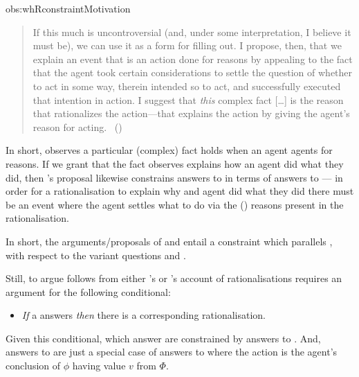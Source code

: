 \begin{note}
\begin{motivation}{obs:whRconstraintMotivation}
\begin{quote}
      If this much is uncontroversial (and, under some interpretation, I believe it must be), we can use it as a form for filling out.
      I propose, then, that we explain an event that is an action done for reasons by appealing to the fact that the agent took certain considerations to settle the question of whether to act in some way, therein intended so to act, and successfully executed that intention in action.
      I suggest that \emph{this} complex fact [\dots] is the reason that rationalizes the action---that explains the action by giving the agent's reason for acting.%
      \mbox{ }\hfill\mbox{(\citeyear[421]{Hieronymi:2011aa})}
    \end{quote}
    In short, \citeauthor{Hieronymi:2011aa} observes a particular (complex) fact holds when an agent agents for reasons.
    If we grant that the fact \citeauthor{Hieronymi:2011aa} observes explains how an agent did what they did, then \citeauthor{Hieronymi:2011aa}'s proposal likewise constrains answers to \qWhyR{} in terms of answers to \qHowR{} --- in order for a rationalisation to explain why and agent did what they did there must be an event where the agent settles what to do via the (\agents{}) reasons present in the rationalisation.
  \end{motivation}

  \noindent%
  In short, the arguments/proposals of \citeauthor{Davidson:1963aa} and \citeauthor{Hieronymi:2011aa} entail a constraint which parallels \issueInclusion{}, with respect to the variant questions \qWhyR{} and \qHowR{}.

  Still, to argue \issueInclusion{} follows from either \citeauthor{Davidson:1963aa}'s or \citeauthor{Hieronymi:2011aa}'s account of rationalisations requires an argument for the following conditional:
  \begin{itemize}
  \item
    \emph{If} a \ros{} answers \qWhy{} \emph{then} there is a corresponding rationalisation.
  \end{itemize}
  Given this conditional,  which answer \qWhy{} are constrained by answers to \qHowR{}.
  And, answers to \qHow{} are just a special case of answers to \qHowR{} where the action is the agent's conclusion of \(\phi\) having value \(v\) from \(\Phi\).
\end{note}


